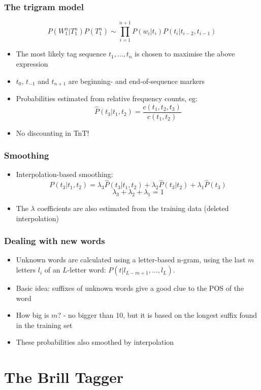 \begin{frame}
  \frametitle{The trigram model}
  \[ P(W_1^n | T_1^n)P(T_1^n) \sim \prod_{i=1}^{n+1} P(w_i | t_i)  P(t_i|t_{i-2},t_{i-1})\]

  \begin{itemize}
  \item<1-> The most likely tag sequence $t_1, \ldots, t_n$ is chosen to
    maximise the above expression
  \item<1-> $t_0$, $t_{-1}$ and $t_{n+1}$ are beginning- and end-of-sequence markers
  \item<2-> Probabilities estimated from relative frequency counts, eg:
    \[ \hat{P}(t_3|t_1, t_2) = \frac{c(t_1,t_2,t_3)}{c(t_1,t_2)} \]
  \item<2-> No discounting in TnT!
  \end{itemize}
\end{frame}

\begin{frame}
  \frametitle{Smoothing}
  \begin{itemize}
  \item<1-> Interpolation-based smoothing:
    \[ P(t_3|t_1, t_2) = \lambda_3 \hat{P}(t_3|t_1, t_2) +
    \lambda_2 \hat{P}(t_3|t_2) + \lambda_1 \hat{P}(t_3) \]
    \[ \lambda_3 + \lambda_2 + \lambda_1 = 1 \]
  \item<2-> The $\lambda$ coefficients are also estimated from the
    training data (deleted interpolation)
  \end{itemize}
\end{frame}

\begin{frame}
  \frametitle{Dealing with new words}
  \begin{itemize}
  \item<1-> Unknown words are calculated using a letter-based n-gram,
    using the last $m$ letters $l_i$ of an $L$-letter word:
    $P(t|l_{L-m+1}, \ldots, l_L)$.
  \item<2-> Basic idea: suffixes of unknown words give a good clue to the
    POS of the word 
  \item<2-> How big is $m$? - no bigger than 10, but it is based on the
    longest suffix found in the training set 
  \item<2-> These probabilities also smoothed by interpolation
  \end{itemize}
\end{frame}

\section{The Brill Tagger}

